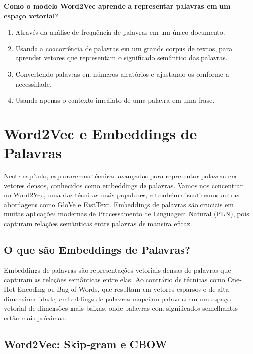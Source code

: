 \documentclass[14pt,a4paper,oneside]{book}
\begin{document}
\begin{enumerate}
\textbf{Como o modelo Word2Vec aprende a representar palavras em um espaço vetorial?}
\begin{enumerate}[label=\alph*)]
\item Através da análise de frequência de palavras em um único documento.
\item Usando a coocorrência de palavras em um grande corpus de textos, para aprender vetores que representam o significado semântico das palavras.
\item Convertendo palavras em números aleatórios e ajustando-os conforme a necessidade.
\item Usando apenas o contexto imediato de uma palavra em uma frase.
\end{enumerate}

\end{enumerate}

	
\chapter{Word2Vec e Embeddings de Palavras}

Neste capítulo, exploraremos técnicas avançadas para representar palavras em vetores densos, conhecidos como embeddings de palavras. Vamos nos concentrar no Word2Vec, uma das técnicas mais populares, e também discutiremos outras abordagens como GloVe e FastText. Embeddings de palavras são cruciais em muitas aplicações modernas de Processamento de Linguagem Natural (PLN), pois capturam relações semânticas entre palavras de maneira eficaz.

\section{O que são Embeddings de Palavras?}

Embeddings de palavras são representações vetoriais densas de palavras que capturam as relações semânticas entre elas. Ao contrário de técnicas como One-Hot Encoding ou Bag of Words, que resultam em vetores esparsos e de alta dimensionalidade, embeddings de palavras mapeiam palavras em um espaço vetorial de dimensões mais baixas, onde palavras com significados semelhantes estão mais próximas.

\section{Word2Vec: Skip-gram e CBOW}
\end{document}
